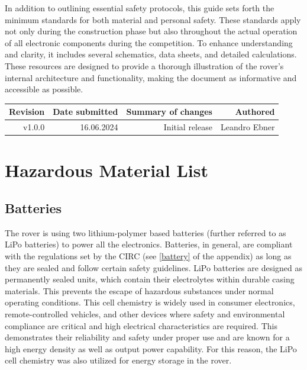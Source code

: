     \vspace{5mm}

    In addition to outlining essential safety protocols, this guide sets forth the minimum standards for both material and personal safety. These standards apply not only during the construction phase but also throughout the actual operation of all electronic components during the competition. To enhance understanding and clarity, it includes several schematics, data sheets, and detailed calculations. These resources are designed to provide a thorough illustration of the rover's internal architecture and functionality, making the document as informative and accessible as possible.

    \begin{table}[b!]
        \centering
        \begin{tabular}{|r|r|r|r|} \hline 
             Revision&  Date submitted& Summary of changes  &Authored \\ \hline 
             v1.0.0&  16.06.2024& Initial release  &Leandro Ebner \\ \hline
        \end{tabular}
    \end{table}

    \clearpage      
    
\section{Hazardous Material List}

    \subsection{Batteries}
    
    The rover is using two lithium-polymer based batteries (further referred to as LiPo batteries) to power all the electronics. Batteries, in general, are compliant with the regulations set by the CIRC (see \ref{battery} of the appendix) as long as they are sealed and follow certain safety guidelines. LiPo batteries are designed as permanently sealed units, which contain their electrolytes within durable casing materials. This prevents the escape of hazardous substances under normal operating conditions. This cell chemistry is widely used in consumer electronics, remote-controlled vehicles, and other devices where safety and environmental compliance are critical and high electrical characteristics are required. This demonstrates their reliability and safety under proper use and are known for a high energy density as well as output power capability. For this reason, the LiPo cell chemistry was also utilized for energy storage in the rover.
    
